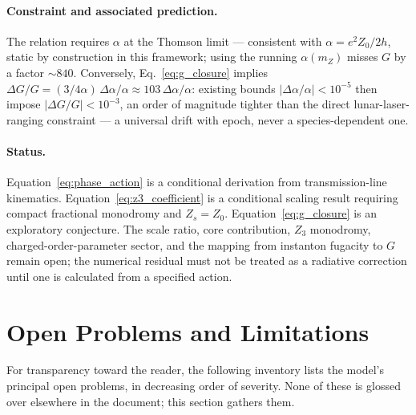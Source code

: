 \documentclass[11pt,a4paper]{article}
\theoremstyle{plain}
\theoremstyle{remark}
\begin{document}
\paragraph{Constraint and associated prediction.} The relation requires $\alpha$ at the Thomson limit --- consistent with $\alpha = e^2 Z_0/2h$, static by construction in this framework; using the running $\alpha(m_Z)$ misses $G$ by a factor $\sim 840$. Conversely, Eq.~\eqref{eq:g_closure} implies $\Delta G/G = (3/4\alpha)\,\Delta\alpha/\alpha \approx 103\,\Delta\alpha/\alpha$: existing bounds $|\Delta\alpha/\alpha| < 10^{-5}$ then impose $|\Delta G/G| < 10^{-3}$, an order of magnitude tighter than the direct lunar-laser-ranging constraint --- a universal drift with epoch, never a species-dependent one.

\paragraph{Status.} Equation~\eqref{eq:phase_action} is a conditional derivation from transmission-line kinematics. Equation~\eqref{eq:z3_coefficient} is a conditional scaling result requiring compact fractional monodromy and $Z_s=Z_0$. Equation~\eqref{eq:g_closure} is an exploratory conjecture. The scale ratio, core contribution, $Z_3$ monodromy, charged-order-parameter sector, and the mapping from instanton fugacity to $G$ remain open; the numerical residual must not be treated as a radiative correction until one is calculated from a specified action.

\section{Open Problems and Limitations}
\label{sec:open_problems}
For transparency toward the reader, the following inventory lists the model's principal open problems, in decreasing order of severity. None of these is glossed over elsewhere in the document; this section gathers them.
\end{document}
